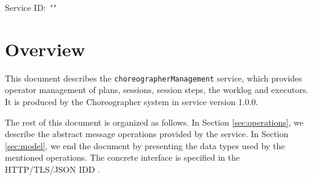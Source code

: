 \documentclass[a4paper]{arrowhead}
\begin{document}
\sloppy

\ArrowheadSetup

\begin{center}
  \vspace*{1cm}
  \huge{\arrowtitle}

  \vspace*{0.2cm}
  \LARGE{\arrowtype}
  \vspace*{1cm}

  \Large{Service ID: \textit{"\arrowid"}}

  \vspace*{\fill}


  \vspace*{1cm}
  \vspace*{\fill}

  \begin{abstract}
    This document describes the \texttt{choreographer\allowbreak{}Management} service, version 1.0.0, produced by the Choreographer support system of Arrowhead 5.2.2.
  \end{abstract}

  \vspace*{1cm}
\end{center}

\newpage

\tableofcontents
\newpage

\section{Overview}
\label{sec:overview}

This document describes the \texttt{choreographer\allowbreak{}Management} service, which provides operator management of plans, sessions, session steps, the worklog and executors.
It is produced by the Choreographer system \cite{cho-sysd} in service version 1.0.0.

The rest of this document is organized as follows.
In Section \ref{sec:operations}, we describe the abstract message operations provided by the service.
In Section \ref{sec:model}, we end the document by presenting the data types used by the mentioned operations.
The concrete interface is specified in the HTTP/TLS/JSON IDD \cite{cho-choreographerManagement-http-idd}.
\end{document}
